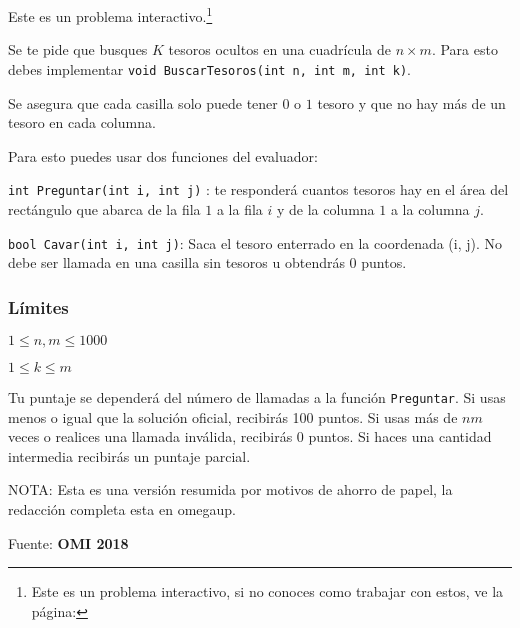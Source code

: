 Este es un problema interactivo.\footnote{Este es un problema interactivo, si no conoces como trabajar con estos, ve la página: \pageref{interactivos}}

Se te pide que busques \(K\) tesoros ocultos en una cuadrícula de \(n\times m\). Para esto debes implementar \verb|void BuscarTesoros(int n, int m, int k)|.

Se asegura que cada casilla solo puede tener \(0\) o \(1\) tesoro y que no hay más de un tesoro en cada columna.

Para esto puedes usar dos funciones del evaluador:

\verb|int Preguntar(int i, int j)| : te responderá cuantos tesoros hay en el área del rectángulo que abarca de la fila \(1\) a la fila \(i\) y de la columna \(1\) a la columna \(j\).

\verb|bool Cavar(int i, int j)|: Saca el tesoro enterrado en la coordenada (i, j). No debe ser llamada en una casilla sin tesoros u obtendrás 0 puntos.

\subsubsection*{Límites}
\begin{plimits}
	\item \(1\leq n, m \leq 1000\)
	\item \(1\leq k \leq m\)
\end{plimits}

Tu puntaje se dependerá del número de llamadas a la función \verb|Preguntar|. Si usas menos o igual que la solución oficial, recibirás 100 puntos. Si usas más de \(nm\)  veces o realices una llamada inválida, recibirás 0 puntos. Si haces una cantidad intermedia recibirás un puntaje parcial.

NOTA: Esta es una versión resumida por motivos de ahorro de papel, la redacción completa esta en omegaup.

Fuente: \textbf{OMI 2018}

